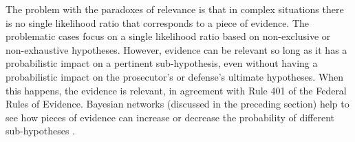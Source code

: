 \documentclass{article}
\begin{document}
\noindent
%
%

The problem with the  paradoxes of relevance is that in complex situations there is no single likelihood ratio that corresponds to a piece of evidence. The problematic cases focus on a single likelihood ratio based on non-exclusive or non-exhaustive hypotheses.  However, evidence can be relevant so long as it has a probabilistic impact on a  pertinent sub-hypothesis,  even without having a probabilistic impact on the prosecutor's or defense's ultimate hypotheses. When this happens, the evidence is relevant, in agreement with Rule 401 of the Federal Rules of Evidence. Bayesian networks (discussed in the preceding section) help to see how pieces of evidence can increase or decrease the probability of different sub-hypotheses  \citep[for more details, see][]{dezoete2019ResolvingSocalledProbabilistic}. 


\end{document}
